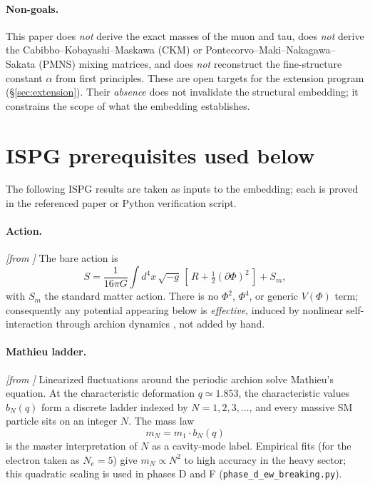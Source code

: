 \documentclass[11pt]{article}
\newcommand{\fromISPG}[1]{\textit{[from #1]}}
\begin{document}
\paragraph{Non-goals.}
This paper does \emph{not} derive the exact masses of the muon and
tau, does \emph{not} derive the Cabibbo--Kobayashi--Maskawa (CKM)
or Pontecorvo--Maki--Nakagawa--Sakata (PMNS) mixing matrices, and
does \emph{not} reconstruct the fine-structure constant $\alpha$
from first principles. These are open targets for the extension
program (\S\ref{sec:extension}). Their \emph{absence} does not
invalidate the structural embedding; it constrains the scope of
what the embedding establishes.

\section{ISPG prerequisites used below}
\label{sec:prereq}

The following ISPG results are taken as inputs to the embedding;
each is proved in the referenced paper or Python verification
script.

\paragraph{Action.} \fromISPG{\cite{Lotishvili2026}}
The bare action is
\begin{equation}
  \label{eq:action}
  S = \frac{1}{16\pi G}\int d^4x\,\sqrt{-g}\,
  \left[\,R + \tfrac{1}{2}(\partial\Phi)^2\,\right] + S_m,
\end{equation}
with $S_m$ the standard matter action. There is no $\Phi^2$,
$\Phi^4$, or generic $V(\Phi)$ term; consequently any potential
appearing below is \emph{effective}, induced by nonlinear
self-interaction through archion dynamics
\cite{Copeland1995,GleiserWatkins1993}, not added by hand.

\paragraph{Mathieu ladder.} \fromISPG{\cite{Lotishvili2026}}
Linearized fluctuations around the periodic archion solve
Mathieu's equation. At the characteristic deformation
$q\simeq 1.853$, the characteristic values $b_N(q)$ form a
discrete ladder indexed by $N=1,2,3,\ldots$, and every massive SM
particle sits on an integer $N$. The mass law
\begin{equation}
  \label{eq:massN}
  m_N = m_1 \cdot b_N(q)
\end{equation}
is the master interpretation of $N$ as a cavity-mode label.
Empirical fits (for the electron taken as $N_e=5$) give
$m_N\propto N^2$ to high accuracy in the heavy sector; this
quadratic scaling is used in phases D and F
(\texttt{phase\_d\_ew\_breaking.py}).
\end{document}
